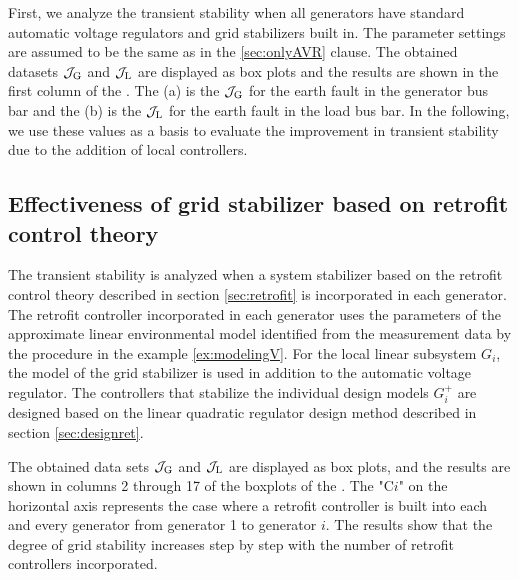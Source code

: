 \documentclass[tombow,dvipdfmx]{corona-a5-1.1}
\begin{document}

First, we analyze the transient stability when all generators have standard automatic voltage regulators and grid stabilizers built in.
The parameter settings are assumed to be the same as in the \ref{sec:onlyAVR} clause.
The obtained datasets $\mathcal{J}_{\rm G}$ and $\mathcal{J}_{\rm L}$ are displayed as box plots and the results are shown in the first column of the .
The (a) is the $\mathcal{J}_{\rm G}$ for the earth fault in the generator bus bar and the (b) is the $\mathcal{J}_{\rm L}$ for the earth fault in the load bus bar.
In the following, we use these values as a basis to evaluate the improvement in transient stability due to the addition of local controllers.

\subsection{Effectiveness of grid stabilizer based on retrofit control theory}

The transient stability is analyzed when a system stabilizer based on the retrofit control theory described in section \ref{sec:retrofit} is incorporated in each generator.
The retrofit controller incorporated in each generator uses the parameters of the approximate linear environmental model identified from the measurement data by the procedure in the example \ref{ex:modelingV}.
For the local linear subsystem $G_i$, the model of the grid stabilizer is used in addition to the automatic voltage regulator.
The controllers that stabilize the individual design models $G^+_i$ are designed based on the linear quadratic regulator design method described in section \ref{sec:designret}.

The obtained data sets $\mathcal{J}_{\rm G}$ and $\mathcal{J}_{\rm L}$ are displayed as box plots, and the results are shown in columns 2 through 17 of the boxplots of the .
The "C$i$" on the horizontal axis represents the case where a retrofit controller is built into each and every generator from generator 1 to generator $i$.
The results show that the degree of grid stability increases step by step with the number of retrofit controllers incorporated.
\end{document}
